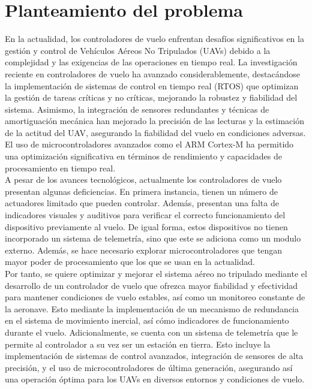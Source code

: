 \section{Planteamiento del problema}

En la actualidad, los controladores de vuelo enfrentan desafíos significativos en la gestión y control de Vehículos Aéreos No Tripulados (UAVs) debido a la complejidad y las exigencias de las operaciones en tiempo real. La investigación reciente en controladores de vuelo ha avanzado considerablemente, destacándose la implementación de sistemas de control en tiempo real (RTOS) que optimizan la gestión de tareas críticas y no críticas, mejorando la robustez y fiabilidad del sistema. Asimismo, la integración de sensores redundantes y técnicas de amortiguación mecánica han mejorado la precisión de las lecturas y la estimación de la actitud del UAV, asegurando la fiabilidad del vuelo en condiciones adversas. El uso de microcontroladores avanzados como el ARM Cortex-M ha permitido una optimización significativa en términos de rendimiento y capacidades de procesamiento en tiempo real.\\


A pesar de los avances tecnológicos, actualmente los controladores de vuelo presentan algunas deficiencias. En primera instancia, tienen un número de actuadores limitado que pueden controlar. Además, presentan una falta de indicadores visuales y auditivos para verificar el correcto funcionamiento del dispositivo previamente al vuelo. De igual forma, estos dispositivos no tienen incorporado un sistema de telemetría, sino que este se adiciona como un modulo externo. Además, se hace necesario explorar microcontroladores que tengan mayor poder de procesamiento que los que se usan en la actualidad. \\


Por tanto, se quiere optimizar y mejorar el sistema aéreo no tripulado mediante el desarrollo de un controlador de vuelo que ofrezca mayor fiabilidad y efectividad para mantener condiciones de vuelo estables, así como un monitoreo constante de la aeronave. Esto mediante la implementación de un mecanismo de redundancia en el sistema de movimiento inercial, así cómo indicadores de funcionamiento durante el vuelo. Adicionalmente, se cuenta con un sistema de telemetría que le permite al controlador a su vez ser un estación en tierra. Esto incluye la implementación de sistemas de control avanzados, integración de sensores de alta precisión, y el uso de microcontroladores de última generación, asegurando así una operación óptima para los UAVs en diversos entornos y condiciones de vuelo.